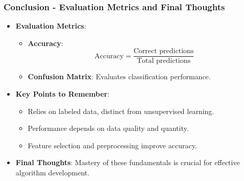 \documentclass{beamer}
\begin{document}
\begin{frame}[fragile]
    \frametitle{Conclusion - Evaluation Metrics and Final Thoughts}
    \begin{itemize}
        \item \textbf{Evaluation Metrics}:
        \begin{itemize}
            \item \textbf{Accuracy}:
            \begin{equation}
                \text{Accuracy} = \frac{\text{Correct predictions}}{\text{Total predictions}}
            \end{equation}
            \item \textbf{Confusion Matrix}: Evaluates classification performance.
        \end{itemize}
        \item \textbf{Key Points to Remember}:
        \begin{itemize}
            \item Relies on labeled data, distinct from unsupervised learning.
            \item Performance depends on data quality and quantity.
            \item Feature selection and preprocessing improve accuracy.
        \end{itemize}
        \item \textbf{Final Thoughts}: Mastery of these fundamentals is crucial for effective algorithm development.
    \end{itemize}
\end{frame}
\end{document}
